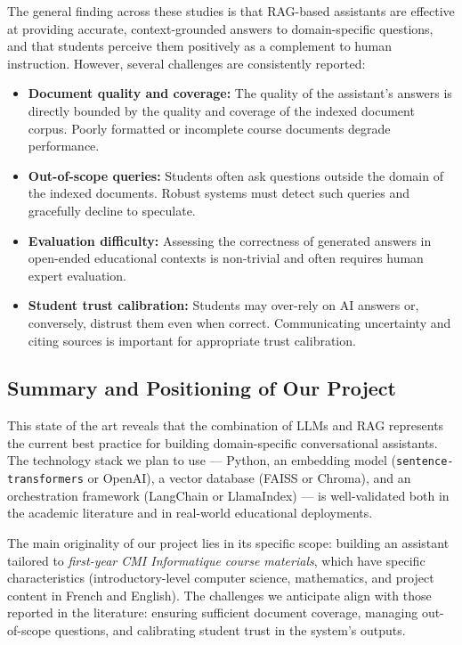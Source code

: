 \documentclass[a4paper,11pt]{article}
\begin{document}
The general finding across these studies is that RAG-based assistants are
effective at providing accurate, context-grounded answers to domain-specific
questions, and that students perceive them positively as a complement to human
instruction. However, several challenges are consistently reported:
 
\begin{itemize}
  \item \textbf{Document quality and coverage:} The quality of the assistant's
    answers is directly bounded by the quality and coverage of the indexed
    document corpus. Poorly formatted or incomplete course documents degrade
    performance.
  \item \textbf{Out-of-scope queries:} Students often ask questions outside
    the domain of the indexed documents. Robust systems must detect such
    queries and gracefully decline to speculate.
  \item \textbf{Evaluation difficulty:} Assessing the correctness of generated
    answers in open-ended educational contexts is non-trivial and often
    requires human expert evaluation.
  \item \textbf{Student trust calibration:} Students may over-rely on AI
    answers or, conversely, distrust them even when correct. Communicating
    uncertainty and citing sources is important for appropriate trust
    calibration.
\end{itemize}
 
\newpage
\subsection{Summary and Positioning of Our Project}
 
This state of the art reveals that the combination of LLMs and RAG represents
the current best practice for building domain-specific conversational
assistants. The technology stack we plan to use --- Python, an embedding model
(\texttt{sentence-transformers} or OpenAI), a vector database (FAISS or
Chroma), and an orchestration framework (LangChain or LlamaIndex) --- is
well-validated both in the academic literature and in real-world educational
deployments.
 
The main originality of our project lies in its specific scope: building an
assistant tailored to \emph{first-year CMI Informatique course materials},
which have specific characteristics (introductory-level computer science,
mathematics, and project content in French and English). The challenges we
anticipate align with those reported in the literature: ensuring sufficient
document coverage, managing out-of-scope questions, and calibrating student
trust in the system's outputs.
\newpage



\end{document}

